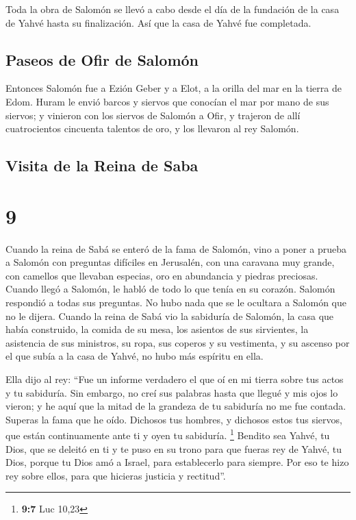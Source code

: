  Toda la obra de Salomón se llevó a cabo desde el día de
la fundación de la casa de Yahvé hasta su finalización. Así que la casa
de Yahvé fue completada.

\hypertarget{paseos-de-ofir-de-salomuxf3n}{%
\subsection{Paseos de Ofir de
Salomón}\label{paseos-de-ofir-de-salomuxf3n}}

 Entonces Salomón fue a Ezión Geber y a Elot, a la orilla
del mar en la tierra de Edom.  Huram le envió barcos y
siervos que conocían el mar por mano de sus siervos; y vinieron con los
siervos de Salomón a Ofir, y trajeron de allí cuatrocientos cincuenta
talentos de oro, y los llevaron al rey Salomón.

\hypertarget{visita-de-la-reina-de-saba}{%
\subsection{Visita de la Reina de
Saba}\label{visita-de-la-reina-de-saba}}

\hypertarget{section-8}{%
\section{9}\label{section-8}}

 Cuando la reina de Sabá se enteró de la fama de Salomón,
vino a poner a prueba a Salomón con preguntas difíciles en Jerusalén,
con una caravana muy grande, con camellos que llevaban especias, oro en
abundancia y piedras preciosas. Cuando llegó a Salomón, le habló de todo
lo que tenía en su corazón.  Salomón respondió a todas sus
preguntas. No hubo nada que se le ocultara a Salomón que no le dijera.
 Cuando la reina de Sabá vio la sabiduría de Salomón, la
casa que había construido,  la comida de su mesa, los
asientos de sus sirvientes, la asistencia de sus ministros, su ropa, sus
coperos y su vestimenta, y su ascenso por el que subía a la casa de
Yahvé, no hubo más espíritu en ella.

 Ella dijo al rey: ``Fue un informe verdadero el que oí en
mi tierra sobre tus actos y tu sabiduría.  Sin embargo, no
creí sus palabras hasta que llegué y mis ojos lo vieron; y he aquí que
la mitad de la grandeza de tu sabiduría no me fue contada. Superas la
fama que he oído.  Dichosos tus hombres, y dichosos estos
tus siervos, que están continuamente ante ti y oyen tu sabiduría.
\footnote{\textbf{9:7} Luc 10,23}  Bendito sea Yahvé, tu
Dios, que se deleitó en ti y te puso en su trono para que fueras rey de
Yahvé, tu Dios, porque tu Dios amó a Israel, para establecerlo para
siempre. Por eso te hizo rey sobre ellos, para que hicieras justicia y
rectitud''.

